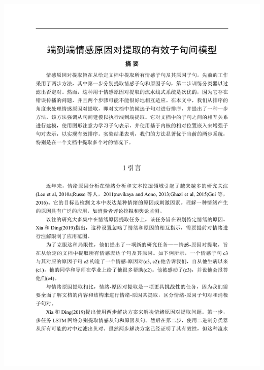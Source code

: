 
{\centering
\includegraphics[width=\textwidth, page=1, trim = 15mm 30mm 15mm 20mm]{pdfs/论文翻译.pdf}

}
